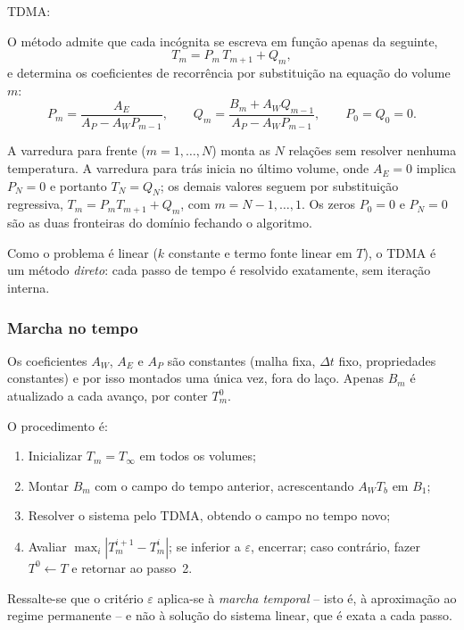 TDMA:

O método admite que cada incógnita se escreva em função apenas da seguinte,
\begin{equation}
  T_m = P_m\,T_{m+1} + Q_m ,
\end{equation}
e determina os coeficientes de recorrência por substituição na equação do
volume $m$:
\begin{equation}
  P_m=\frac{A_E}{A_P-A_W P_{m-1}},\qquad
  Q_m=\frac{B_m+A_W Q_{m-1}}{A_P-A_W P_{m-1}},\qquad P_0=Q_0=0 .
\end{equation}

A varredura para frente ($m=1,\dots,N$) monta as $N$ relações sem resolver
nenhuma temperatura. A varredura para trás inicia no último volume, onde
$A_E=0$ implica $P_N=0$ e portanto $T_N=Q_N$; os demais valores seguem por
substituição regressiva, $T_m=P_mT_{m+1}+Q_m$, com $m=N-1,\dots,1$. Os zeros
$P_0=0$ e $P_N=0$ são as duas fronteiras do domínio fechando o algoritmo.

Como o problema é linear ($k$ constante e termo fonte linear em $T$), o TDMA é
um método \emph{direto}: cada passo de tempo é resolvido exatamente, sem
iteração interna.

\subsubsection*{Marcha no tempo}

Os coeficientes $A_W$, $A_E$ e $A_P$ são constantes (malha fixa, $\Delta t$
fixo, propriedades constantes) e por isso montados uma única vez, fora do
laço. Apenas $B_m$ é atualizado a cada avanço, por conter $T_m^{0}$.

O procedimento é:

\begin{enumerate}
  \item Inicializar $T_m = T_\infty$ em todos os volumes;
  \item Montar $B_m$ com o campo do tempo anterior, acrescentando
        $A_W T_b$ em $B_1$;
  \item Resolver o sistema pelo TDMA, obtendo o campo no tempo novo;
  \item Avaliar $\max_i|T_m^{i+1}-T_m^{i}|$; se inferior a $\varepsilon$,
        encerrar; caso contrário, fazer $T^{0}\leftarrow T$ e retornar ao
        passo~2.
\end{enumerate}

Ressalte-se que o critério $\varepsilon$ aplica-se à \emph{marcha temporal} --
isto é, à aproximação ao regime permanente -- e não à solução do sistema
linear, que é exata a cada passo.

